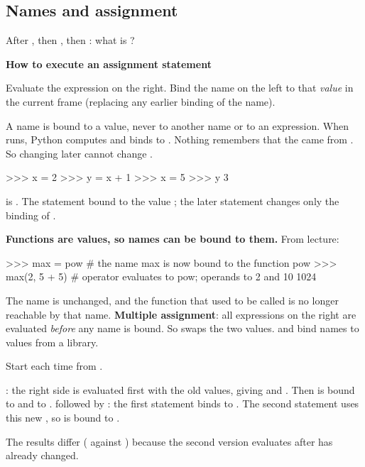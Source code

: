 \documentclass[10pt]{scrartcl}
\newenvironment{howto}[1]{\begin{mdframed}[style=howtostyle]{\color{NavyBlue}\textbf{#1}}\par\vspace{2pt}}{\end{mdframed}}
\begin{document}
\subsection{Names and assignment}

\begin{qbox}
  After , then , then : what is ?
\end{qbox}
\begin{howto}{How to execute an assignment statement \cd{name = expression}}
\begin{steps}
  \ii Evaluate the expression on the right.
  \ii Bind the name on the left to that \emph{value} in the current frame (replacing any earlier binding of the name).
\end{steps}
\end{howto}
\begin{ideabox}
A name is bound to a value, never to another name or to an expression. When  runs, Python computes  and binds  to . Nothing remembers that the  came from . So changing  later cannot change .
\end{ideabox}
\begin{py}
>>> x = 2
>>> y = x + 1
>>> x = 5
>>> y
3
\end{py}
\revisit {} is . The statement  bound  to the value ; the later statement  changes only the binding of .

\textbf{Functions are values, so names can be bound to them.} From lecture:
\begin{py}
>>> max = pow        # the name max is now bound to the function pow
>>> max(2, 5 + 5)    # operator evaluates to pow; operands to 2 and 10
1024
\end{py}
\begin{itemize}
  \ii The name  is unchanged, and the function that used to be called  is no longer reachable by that name.
  \ii \textbf{Multiple assignment}: all expressions on the right are evaluated \emph{before} any name is bound. So  swaps the two values.
  \ii {} and  bind names to values from a library.
\end{itemize}

\begin{example*}
Start each time from .
\begin{itemize}
  \ii {}: the right side is evaluated first with the old values, giving  and . Then  is bound to  and  to .
  \ii {} followed by : the first statement binds  to . The second statement uses this new , so  is bound to .
\end{itemize}
The results differ ( against ) because the second version evaluates  after  has already changed.
\end{example*}
\end{document}
